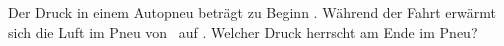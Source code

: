 Der Druck in einem Autopneu beträgt zu Beginn \pEiO. Während der Fahrt erwärmt sich die Luft im Pneu von \thEiO\ auf \thZwO. Welcher Druck herrscht am Ende im Pneu?
